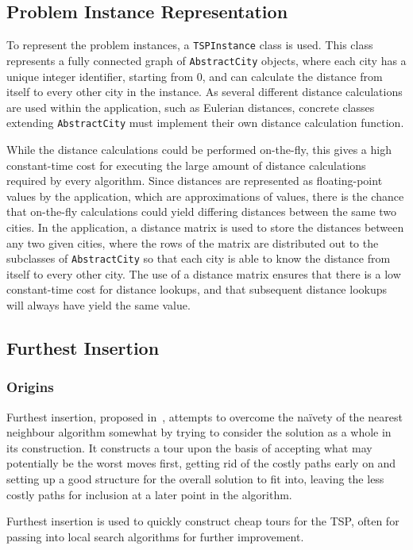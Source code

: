 \documentclass{l4proj}
\begin{document}
\subsection{Problem Instance Representation}
To represent the problem instances, a \texttt{TSPInstance} class is used. This class represents a fully connected graph 
of \texttt{AbstractCity} objects, where each city has a unique integer identifier, starting from 0, and can calculate the 
distance from itself to every other city in the instance. As several different distance calculations are used within the 
application, such as Eulerian distances, concrete classes extending \texttt{AbstractCity} must implement their own distance calculation function.

While the distance calculations could be performed on-the-fly, this gives a high constant-time cost for executing the large amount 
of distance calculations required by every algorithm. Since distances are represented as floating-point values by the application, 
which are approximations of values, there is the chance that on-the-fly calculations could yield differing distances between the same 
two cities. In the application, a distance matrix is used to store the distances between any two given cities, where the rows of the 
matrix are distributed out to the subclasses of \texttt{AbstractCity} so that each city is able to know the distance from itself to 
every other city. The use of a distance matrix ensures that there is a low constant-time cost for distance lookups, and that subsequent 
distance lookups will always have yield the same value.


\subsection{Furthest Insertion}
\subsubsection{Origins}
Furthest insertion, proposed in~\cite{travelIBM}, attempts to overcome the na\"ivety of the nearest neighbour algorithm somewhat by trying to consider the solution as a whole in its construction. It constructs a tour upon the basis of accepting what may potentially be the worst moves first, getting rid of the costly paths early on and setting up a good structure for the overall solution to fit into, leaving the less costly paths for inclusion at a later point in the algorithm.

Furthest insertion is used to quickly construct cheap tours for the TSP, often for passing into local search algorithms for further improvement.
\end{document}
